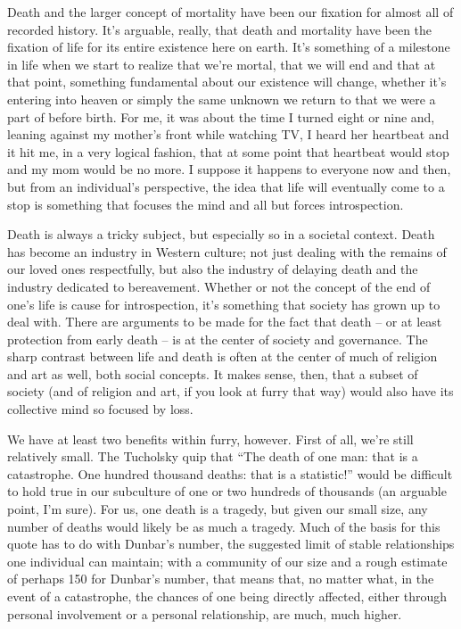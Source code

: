 Death and the larger concept of mortality have been our fixation for almost all of recorded history. It's arguable, really, that death and mortality have been the fixation of life for its entire existence here on earth. It's something of a milestone in life when we start to realize that we're mortal, that we will end and that at that point, something fundamental about our existence will change, whether it's entering into heaven or simply the same unknown we return to that we were a part of before birth. For me, it was about the time I turned eight or nine and, leaning against my mother's front while watching TV, I heard her heartbeat and it hit me, in a very logical fashion, that at some point that heartbeat would stop and my mom would be no more. I suppose it happens to everyone now and then, but from an individual's perspective, the idea that life will eventually come to a stop is something that focuses the mind and all but forces introspection.

Death is always a tricky subject, but especially so in a societal context.  Death has become an industry in Western culture; not just dealing with the remains of our loved ones respectfully, but also the industry of delaying death and the industry dedicated to bereavement.  Whether or not the concept of the end of one's life is cause for introspection, it's something that society has grown up to deal with.  There are arguments to be made for the fact that death -- or at least protection from early death -- is at the center of society and governance.  The sharp contrast between life and death is often at the center of much of religion and art as well, both social concepts.  It makes sense, then, that a subset of society (and of religion and art, if you look at furry that way) would also have its collective mind so focused by loss.

We have at least two benefits within furry, however.  First of all, we're still relatively small.  The Tucholsky quip that ``The death of one man: that is a catastrophe. One hundred thousand deaths: that is a statistic!'' would be difficult to hold true in our subculture of one or two hundreds of thousands (an arguable point, I'm sure).  For us, one death is a tragedy, but given our small size, any number of deaths would likely be as much a tragedy.  Much of the basis for this quote has to do with Dunbar's number, the suggested limit of stable relationships one individual can maintain; with a community of our size and a rough estimate of perhaps 150 for Dunbar's number, that means that, no matter what, in the event of a catastrophe, the chances of one being directly affected, either through personal involvement or a personal relationship, are much, much higher.

